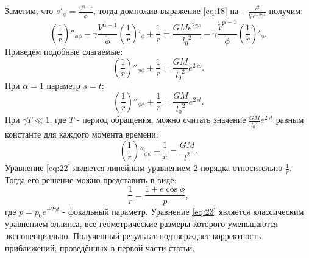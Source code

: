 \documentclass[12pt]{article}
\begin{document}
Заметим, что $s'_\phi = \frac{V^{\alpha - 1}}{\dot{\phi}}$, тогда домножив выражение \ref{eq:18} на $-\frac{r^2}{l_0^2e^{-2\gamma s}}$ получим:
\begin{equation}\label{eq:19}
    \left(\frac{1}{r}\right)''_{\phi\phi} - 
    \gamma \frac{V^{\alpha - 1}}{\dot{\phi}} \left(\frac{1}{r}\right)'_\phi + 
    \frac{1}{r} = \frac{GMe^{2\gamma s}}{{l_0}^2} - \gamma \frac{\dot{V}^{\alpha - 1}}{\dot{\phi}} \left(\frac{1}{r}\right)'_\phi.
\end{equation}
Приведём подобные слагаемые:
\begin{equation}\label{eq:20}
    \left(\frac{1}{r}\right)''_{\phi\phi} + 
    \frac{1}{r} = \frac{GM}{{l_0}^2}e^{2\gamma s}.
\end{equation}
При $\alpha = 1$ параметр $s = t$:
\begin{equation}\label{eq:21}
    \left(\frac{1}{r}\right)''_{\phi\phi} + \frac{1}{r} = \frac{GM}{{l_0}^2}e^{2\gamma t}.
\end{equation}
При $\gamma T \ll 1$, где $T$ - период обращения, можно считать значение $\frac{GM}{{l_0}^2}e^{2\gamma t}$ равным константе для каждого момента 
времени:
\begin{equation}\label{eq:22}
    \left(\frac{1}{r}\right)''_{\phi\phi} + \frac{1}{r} = \frac{GM}{{l}^2}.
\end{equation}
Уравнение \ref{eq:22} является линейным уравнением 2 порядка относительно $\frac{1}{r}$. Тогда его решение можно представить в виде:
\begin{equation}\label{eq:23}
    \frac{1}{r} = \frac{1 + e \cos{\phi}}{p},
\end{equation}
где $p = p_0 e^{-2\gamma t}$ - фокальный параметр. Уравнение \ref{eq:23} является классическим уравнением эллипса, все геометрические размеры 
которого уменьшаются экспоненциально. Полученный результат подтверждает корректность приближений, проведённых в первой части статьи.
\end{document}
